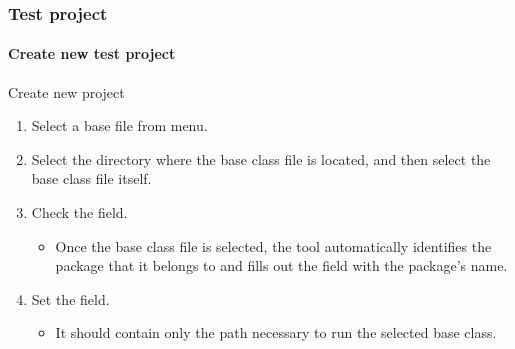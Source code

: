 \begin{frame}[fragile]
\frametitle{Test project}
\framesubtitle{Create new test project}
\label{procedure:create-test-project}
\label{concept:base-class}
\label{concept:classpath}

\begin{block:procedure}{Create new project}
\begin{enumerate}
	\item Select a base  file from 
	menu.

	\item Select the directory where the base class file is located, and then
	select the base class file itself.

	\item Check the  field.
	\begin{itemize}
		\item Once the base class file is selected, the tool automatically
		identifies the package that it belongs to and fills out the
		 field with the package's name.
	\end{itemize}

	\item Set the  field.
	\begin{itemize}
		\item It should contain only the path necessary to run the selected
		base class.
	\end{itemize}
\end{enumerate}
\end{block:procedure}
\end{frame}


